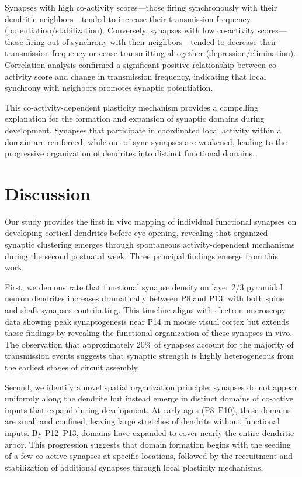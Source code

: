 \documentclass[11pt]{article}
\begin{document}
Synapses with high co-activity scores---those firing synchronously with their dendritic neighbors---tended to increase their transmission frequency (potentiation/stabilization). Conversely, synapses with low co-activity scores---those firing out of synchrony with their neighbors---tended to decrease their transmission frequency or cease transmitting altogether (depression/elimination). Correlation analysis confirmed a significant positive relationship between co-activity score and change in transmission frequency, indicating that local synchrony with neighbors promotes synaptic potentiation.

This co-activity-dependent plasticity mechanism provides a compelling explanation for the formation and expansion of synaptic domains during development. Synapses that participate in coordinated local activity within a domain are reinforced, while out-of-sync synapses are weakened, leading to the progressive organization of dendrites into distinct functional domains.

\section{Discussion}

Our study provides the first in vivo mapping of individual functional synapses on developing cortical dendrites before eye opening, revealing that organized synaptic clustering emerges through spontaneous activity-dependent mechanisms during the second postnatal week. Three principal findings emerge from this work.

First, we demonstrate that functional synapse density on layer 2/3 pyramidal neuron dendrites increases dramatically between P8 and P13, with both spine and shaft synapses contributing. This timeline aligns with electron microscopy data showing peak synaptogenesis near P14 in mouse visual cortex \citep{lendvai2000experience} but extends those findings by revealing the functional organization of these synapses in vivo. The observation that approximately 20\% of synapses account for the majority of transmission events suggests that synaptic strength is highly heterogeneous from the earliest stages of circuit assembly.

Second, we identify a novel spatial organization principle: synapses do not appear uniformly along the dendrite but instead emerge in distinct domains of co-active inputs that expand during development. At early ages (P8--P10), these domains are small and confined, leaving large stretches of dendrite without functional inputs. By P12--P13, domains have expanded to cover nearly the entire dendritic arbor. This progression suggests that domain formation begins with the seeding of a few co-active synapses at specific locations, followed by the recruitment and stabilization of additional synapses through local plasticity mechanisms.
\end{document}

